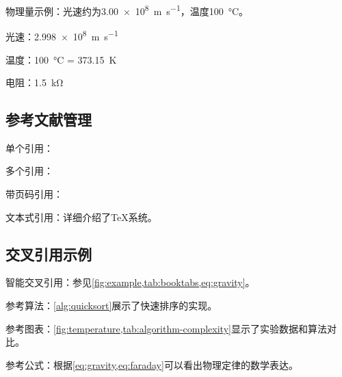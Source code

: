 \documentclass[../main]{subfiles}
\begin{document}
物理量示例：光速约为\SI{3.00e8}{\meter\per\second}，温度\SI{100}{\degreeCelsius}。

光速：\SI{2.998e8}{\meter\per\second}

温度：\SI{100}{\degreeCelsius} = \SI{373.15}{\kelvin}

电阻：\SI{1.5}{\kilo\ohm}

\subsection{参考文献管理}
单个引用：\autocite{knuth1986texbook}

多个引用：\autocite{vaswani2017attention,brown2020language}

带页码引用：\autocite[第35页]{wang2010zhongwen}

文本式引用：\textcite{knuth1986texbook}详细介绍了TeX系统。

\subsection{交叉引用示例}
智能交叉引用：参见\cref{fig:example,tab:booktabs,eq:gravity}。

参考算法：\cref{alg:quicksort}展示了快速排序的实现。

参考图表：\cref{fig:temperature,tab:algorithm-complexity}显示了实验数据和算法对比。

参考公式：根据\cref{eq:gravity,eq:faraday}可以看出物理定律的数学表达。
\end{document}
